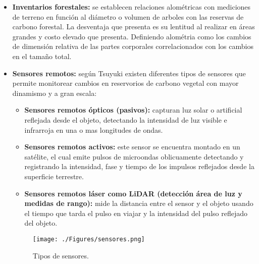 \begin{itemize}
	
	\item \textbf{Inventarios forestales:} se establecen relaciones alom\'etricas con mediciones de terreno en funci\'on al diámetro o volumen de arboles con las reservas de carbono forestal. La desventaja que presenta es su lentitud al realizar en \'areas grandes y costo elevado que presenta\cite{asner2005selective}. Definiendo alom\'etria como los cambios de dimensión relativa de las partes corporales correlacionados con los cambios en el tamaño total. 
	\item \textbf{Sensores remotos:} seg\'un Tsuyuki\cite{libro2012Tsuyuki} existen diferentes tipos de sensores que permite monitorear cambios en reservorios de carbono vegetal con mayor dinamismo y a gran escala:
	\begin{itemize}
	\item \textbf{Sensores remotos \'opticos (pasivos):} capturan luz solar o artificial reflejada desde el objeto, detectando la intensidad de luz visible e infrarroja en una o mas longitudes de ondas.
	\item  \textbf{Sensores remotos activos:} este sensor se encuentra montado en un sat\'elite, el cual emite pulsos de microondas oblicuamente detectando y registrando la intensidad, fase y tiempo de los impulsos reflejados desde la superficie terrestre.
	\item  \textbf{Sensores remotos l\'aser como LiDAR (detecci\'on \'area de luz y medidas de rango):} mide la distancia entre el sensor y el objeto usando el tiempo que tarda el pulso en viajar y la intensidad del pulso reflejado del objeto.
	\end{itemize}
	    \begin{figure}[!hbtp]
	    	\centering
	    	\texttt{[image: ./Figures/sensores.png]}
	    	\caption{Tipos de sensores.}
	    	\label{fig:sensores}
	    \end{figure}
\end{itemize}

 

